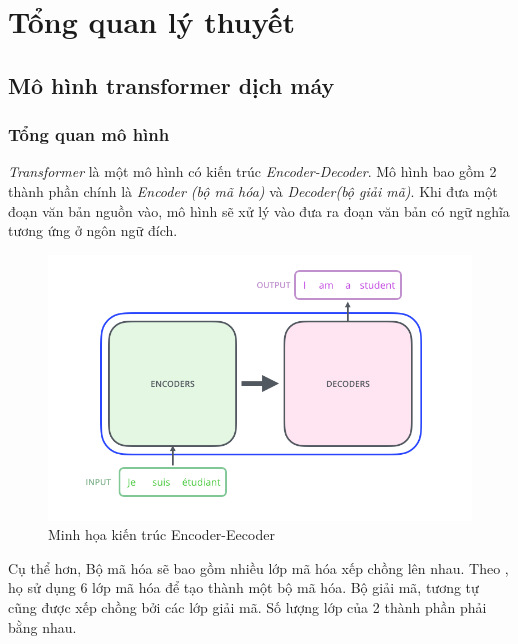 \chapter{Tổng quan lý thuyết}
\label{Chapter2}
\section{Mô hình transformer dịch máy}

\subsection{Tổng quan mô hình}

 \textit{Transformer}  là một mô hình có kiến trúc \textit{Encoder-Decoder}. Mô hình bao gồm 2 thành phần chính là \textit{Encoder (bộ mã hóa)} và \textit{Decoder(bộ giải mã)}. Khi đưa một đoạn văn bản nguồn vào, mô hình sẽ xử lý vào đưa ra đoạn văn bản có ngữ nghĩa tương ứng ở ngôn ngữ đích.

\begin{figure}[H]
    \begin{center}
        \includegraphics[scale=0.4]{images/The_transformer_encoders_decoders}
        \caption{Minh họa kiến trúc Encoder-Eecoder \cite{illustrated.transformer}}
        \label{fig:encoder-decoder}
    \end{center}
\end{figure}

Cụ thể hơn, Bộ mã hóa sẽ bao gồm nhiều lớp mã hóa xếp chồng lên nhau. Theo \cite{transformer}, họ sử dụng 6 lớp mã hóa để tạo thành một bộ mã hóa.  Bộ giải mã, tương tự cũng được xếp chồng bởi các lớp giải mã. Số lượng lớp của 2 thành phần phải bằng nhau.

